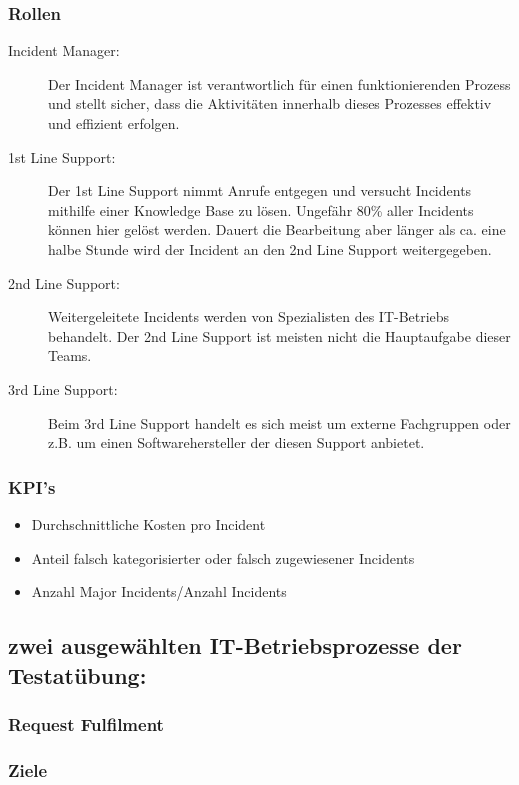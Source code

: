 \subsubsection{Rollen}

\begin{description}
	\item[Incident Manager:] Der Incident Manager ist verantwortlich für einen funktionierenden Prozess und stellt sicher, dass die Aktivitäten innerhalb dieses Prozesses effektiv und effizient erfolgen.
	\item[1st Line Support:] Der 1st Line Support nimmt Anrufe entgegen und versucht Incidents mithilfe einer Knowledge Base zu lösen. Ungefähr 80\% aller Incidents können hier gelöst werden. Dauert die Bearbeitung aber länger als ca. eine halbe Stunde wird der Incident an den 2nd Line Support weitergegeben.
	\item[2nd Line Support:] Weitergeleitete Incidents werden von Spezialisten des IT-Betriebs behandelt. Der 2nd Line Support ist meisten nicht die Hauptaufgabe dieser Teams.
	\item[3rd Line Support:] Beim 3rd Line Support handelt es sich meist um externe Fachgruppen oder z.B. um einen Softwarehersteller der diesen Support anbietet.
\end{description}

\subsubsection{KPI's}

\begin{itemize}
	\item Durchschnittliche Kosten pro Incident
	\item Anteil falsch kategorisierter oder falsch zugewiesener Incidents
	\item Anzahl Major Incidents/Anzahl Incidents
\end{itemize}

\subsection{zwei ausgewählten IT-Betriebsprozesse der Testatübung:}

\subsubsection{Request Fulfilment}

\subsubsection{Ziele}

